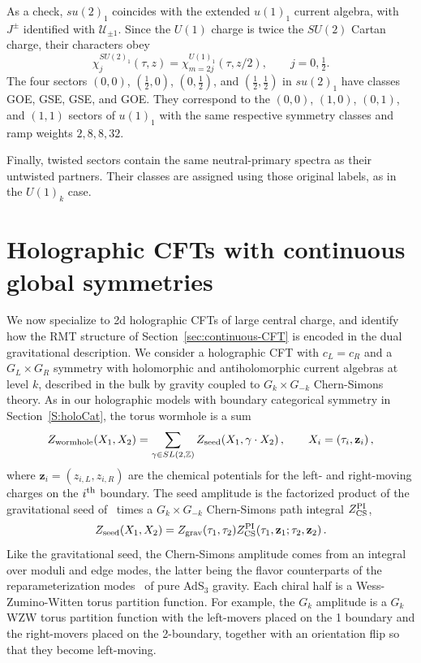 \documentclass[11pt]{article}
\numberwithin{equation}{section}
\begin{document}
As a check, $su(2)_1$ coincides with the extended $u(1)_1$ current algebra, with $J^\pm$ identified with $\mathcal U_{\pm1}$. Since the $U(1)$ charge is twice the $SU(2)$ Cartan charge, their characters obey
\begin{equation}
\chi_j^{SU(2)_1}(\tau,z)
 =\chi_{m=2j}^{U(1)_1}(\tau,z/2),
\qquad j=0,\tfrac12.
\end{equation}
The four sectors $(0,0)$, $(\tfrac12,0)$, $(0,\tfrac12)$, and $(\tfrac12,\tfrac12)$ in  $su(2)_1$ have classes GOE, GSE, GSE, and GOE. They correspond to the $(0,0)$, $(1,0)$, $(0,1)$, and $(1,1)$ sectors of $u(1)_1$ with the same respective symmetry classes and  ramp weights $2,8,8,32$.

Finally, twisted sectors contain the same neutral-primary spectra as their untwisted partners. Their classes are assigned using those original labels, as in the $U(1)_k$ case. 

\section{Holographic CFTs with continuous global symmetries}
\label{sec:continuous-holography}

We now specialize to 2d holographic CFTs of large central charge, and identify how the RMT structure of Section~\ref{sec:continuous-CFT} is encoded in the dual gravitational description. 
We consider a holographic CFT with $c_L=c_R$ and a $G_L\times G_R$ symmetry with holomorphic and antiholomorphic  current algebras at level $k$, described in the bulk by gravity coupled to $G_k\times G_{-k}$ Chern-Simons theory. As in our holographic models with boundary categorical symmetry in Section~\ref{S:holoCat}, the torus wormhole is a sum
\begin{equation}
    Z_{\rm wormhole}(X_1,X_2) = \sum_{\gamma\in SL(2,\mathbb{Z})}Z_{\rm seed}(X_1,\gamma\cdot X_2)\,, \qquad X_i = (\tau_i,\mathbf{z}_i)\,,
    \label{eq:PI-modular-sum}
\end{equation}
where $\mathbf{z}_i=(z_{i,L},z_{i,R})$ are the chemical potentials for the left- and right-moving charges on the $i^{\rm th}$ boundary. The seed amplitude is the factorized product of the gravitational seed of~\cite{Cotler:2020ugk} times a $G_k \times G_{-k}$ Chern-Simons path integral $Z_{\rm CS}^{\rm PI}$,
\begin{equation}
    Z_{\rm seed}(X_1,X_2) = Z_{\rm grav}(\tau_1,\tau_2)Z_{\rm CS}^{\rm PI}(\tau_1,\mathbf{z}_1;\tau_2,\mathbf{z}_2)\,.
    \label{eq:seed-factorization}
\end{equation}
Like the gravitational seed, the Chern-Simons amplitude comes from an integral over moduli and edge modes, the latter being the flavor counterparts of the reparameterization modes~\cite{Cotler:2018zff} of pure AdS$_3$ gravity. Each chiral half is a Wess-Zumino-Witten torus partition function. For example, the $G_k$ amplitude is a $G_k$ WZW torus partition function with the left-movers placed on the 1 boundary and the right-movers placed on the 2-boundary, together with an orientation flip so that they become left-moving. 
\end{document}
